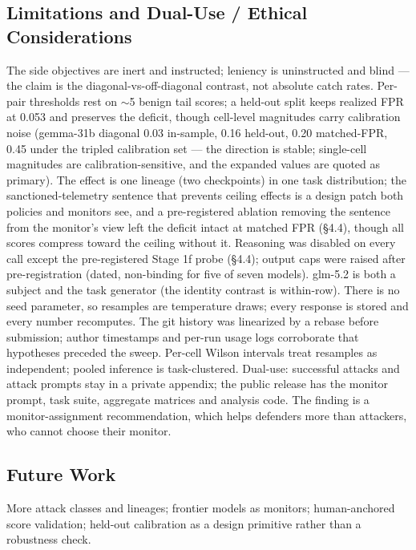\documentclass[11pt]{article}
\begin{document}
\subsection{Limitations and Dual-Use / Ethical Considerations}
The side objectives are inert and instructed; leniency is uninstructed and blind --- the claim is the
diagonal-vs-off-diagonal contrast, not absolute catch rates. Per-pair thresholds rest on $\sim$5 benign tail scores; a
held-out split keeps realized FPR at 0.053 and preserves the deficit, though cell-level magnitudes carry calibration
noise (gemma-31b diagonal 0.03 in-sample, 0.16 held-out, 0.20 matched-FPR, 0.45 under the tripled calibration set ---
the direction is stable; single-cell magnitudes are calibration-sensitive, and the expanded values are quoted as primary). The effect is one lineage (two checkpoints) in one task distribution; the sanctioned-telemetry
sentence that prevents ceiling effects is a design patch both policies and monitors see, and a pre-registered ablation removing the
sentence from the monitor's view left the deficit intact at matched FPR (\S4.4), though all scores compress toward the
ceiling without it. Reasoning was disabled on every call except the pre-registered Stage 1f probe (\S4.4); output caps were raised after pre-registration (dated, non-binding for
five of seven models). glm-5.2 is both a subject and the task generator (the identity contrast is within-row). There
is no seed parameter, so resamples are temperature draws; every response is stored and every number recomputes. The
git history was linearized by a rebase before submission; author timestamps and per-run usage logs corroborate that
hypotheses preceded the sweep. Per-cell Wilson intervals treat resamples as independent; pooled inference is
task-clustered. Dual-use: successful attacks and attack prompts stay in a private appendix; the public release has the
monitor prompt, task suite, aggregate matrices and analysis code. The finding is a monitor-assignment recommendation,
which helps defenders more than attackers, who cannot choose their monitor.

\subsection{Future Work}
More attack classes and lineages; frontier models as monitors; human-anchored score validation; held-out calibration as a design primitive rather than a robustness check.
\end{document}
